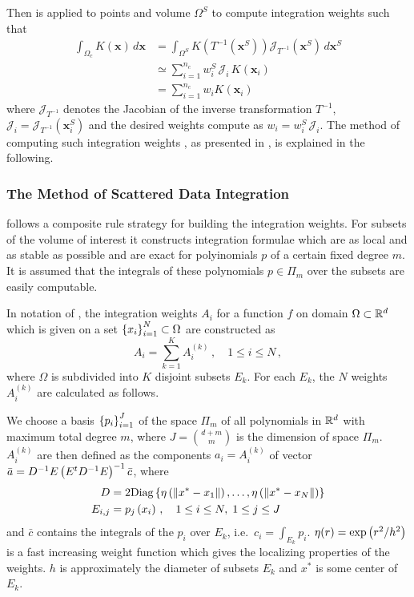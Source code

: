 Then \cite{Levin99} is applied to points \wpS and volume $\Omega^S$ to compute integration weights \weightsS
such that
\begin{align}
\int_{\Omega_c} K(\mathbf{x})\,d\mathbf{x} &= 
           \int_{\Omega^S} K\left(T^{-1}\left(\mathbf{x}^S\right)\right) 
           \mathcal{J}_{T^{-1}}\left(\mathbf{x}^S\right)\,d\mathbf{x}^S \nonumber \\
  &\simeq \sum_{i=1}^{n_c} w^S_i\,\mathcal{J}_i\,K(\mathbf{x}_i) 
   \label{programs_scripts,sec:fmod_intw,eq:integration_standard} \\
  & = \sum_{i=1}^{n_c} w_iK(\mathbf{x}_i) \nonumber
\end{align}
where $\mathcal{J}_{T^{-1}}$ denotes the Jacobian of the inverse transformation $T^{-1}$, $\mathcal{J}_i = 
\mathcal{J}_{T^{-1}}\left(\mathbf{x}^S_i\right)$ and the desired weights compute as $w_i = w^S_i \, \mathcal{J}_i$. 
The method of computing such integration weights \weightsS, as presented in \cite{Levin99}, is explained in 
the following.
%
\subsubsection{The Method of Scattered Data Integration}
%
\cite{Levin99}{} follows a composite rule strategy for building the integration weights. For subsets of the 
volume of interest it constructs integration formulae which are as local and as stable as possible and are 
exact for polyinomials $p$ of a certain fixed degree $m$. It is assumed that the integrals of these polynomials 
$p\in\Pi_m$ over the subsets are easily computable.

In notation of \cite{Levin99}{}, the integration weights $A_i$ for a function $f$ on domain $\Omega\subset\mathbb{R}^d$ 
which is given on a set $\left\{ x_i \right\}_{i=1}^N\subset\Omega$ are constructed as
\[
A_i = \sum_{k=1}^K A_i^{(k)} \,,\quad 1 \le i \le N \, , 
\]
where $\Omega$ is subdivided into $K$ disjoint subsets $E_k$. For each $E_k$, the $N$ weights $A_i^{(k)}$ are 
calculated as follows.

We choose a basis $\left\{ p_i \right\}_{i=1}^J$ of the space $\Pi_m$ of all polynomials in $\mathbb{R}^d$ with maximum total 
degree $m$, where $J = \binom{d+m}{m}$ is the dimension of space $\Pi_m$. 
$A_i^{(k)}$ are then defined as the components $a_i = A_i^{(k)}$ of vector $\bar{a} = 
D^{-1}E\left( E^tD^{-1}E \right)^{-1}\bar{c}$, where
\begin{align*}
  D &= 2\text{Diag}\left\{ \eta\left( \|x^\ast-x_1\| \right),\dots,\eta\left( \|x^\ast-x_N\| \right) \right\}\\
  E_{i,j} &= p_j\left( x_i \right)\,,\quad 1\le i\le N,\; 1\le j\le J
\end{align*}
and $\bar{c}$ contains the integrals of the $p_i$ over $E_k$, i.e.~$c_i = \int_{E_k} p_i$. $\eta(r) = 
\exp\left( r^2/h^2 \right)$ is a fast increasing weight function which gives the localizing properties of the weights. 
$h$ is approximately the diameter of subsets $E_k$ and $x^\ast$ is some center of $E_k$.

